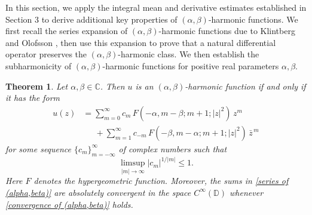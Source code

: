 \documentclass[11pt, reqno]{amsart}
\newtheorem{thm}{Theorem}
\theoremstyle{definition}
\numberwithin{equation}{section}
\theoremstyle{remark}
\numberwithin{equation}{section}
\begin{document}
    In this section, we apply the integral mean and derivative estimates established in Section 3 to derive additional key properties of $(\alpha,\beta)$-harmonic functions. We first recall the series expansion of $(\alpha,\beta)$-harmonic functions due to Klintberg and Olofsson \cite{KlintbergOlofsson}, then use this expansion to prove that a natural differential operator preserves the $(\alpha,\beta)$-harmonic class. We then establish the subharmonicity of $(\alpha,\beta)$-harmonic functions for positive real parameters $\alpha,\beta$. %
    
	
	\begin{thm} \label{thmB}
		Let $\alpha,\beta\in\mathbb{C}$. Then $u$ is an $(\alpha,\beta)$-harmonic function if and only if
		it has the form
		\begin{equation}\label{series of (alpha,beta)}
			\begin{aligned}
				u(z)
				&= \sum_{m=0}^{\infty}
				c_m\,F(-\alpha,m-\beta; m+1; |z|^2)\,z^m  \\
				&\quad\ \ +\sum_{m=1}^{\infty}
				c_{-m}\,F(-\beta,m-\alpha; m+1; |z|^2)\,\bar z^{\,m}
			\end{aligned}
			\end{equation}
		for some sequence $\{c_m\}_{m=-\infty}^{\infty}$ of complex numbers such that
		\begin{equation}\label{convergence of (alpha,beta)}
			\limsup_{|m|\to\infty} |c_m|^{1/|m|} \leq 1.
		\end{equation}
		Here $F$ denotes the hypergeometric function.
		Moreover, the sums in \eqref{series of (alpha,beta)} are absolutely convergent in the space
		$C^{\infty}(\mathbb{D})$ whenever \eqref{convergence of (alpha,beta)} holds.
	\end{thm}
   
\end{document}
